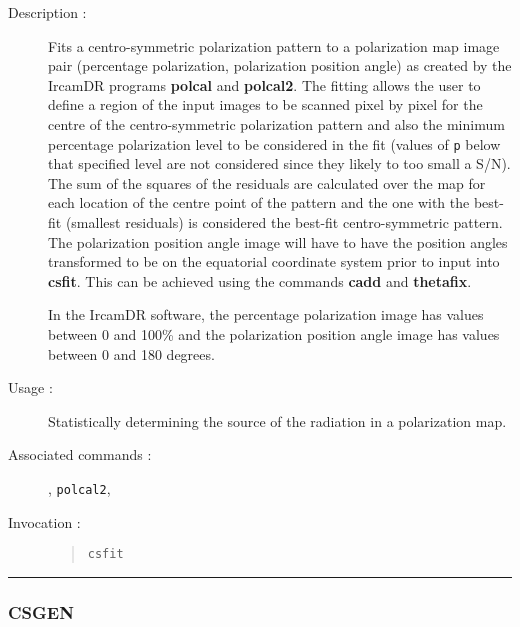 \begin{description}

\item[Description :] Fits a centro-symmetric polarization pattern to a
polarization map image pair (percentage polarization, polarization
position angle) as created by the {\sc IrcamDR} programs {\bf polcal}
and {\bf polcal2}.  The fitting allows the user to define a region of
the input images to be scanned pixel by pixel for the centre of the
centro-symmetric polarization pattern and also the minimum percentage
polarization level to be considered in the fit (values of {\tt p} below
that specified level are not considered since they likely to too small
a S/N).  The sum of the squares of the residuals are calculated over
the map for each location of the centre point of the pattern and the
one with the best-fit (smallest residuals) is considered the best-fit
centro-symmetric pattern.  The polarization position angle image will
have to have the position angles transformed to be on the equatorial
coordinate system prior to input into {\bf csfit}.  This can be
achieved using the commands {\bf cadd} and {\bf thetafix}.

In the {\sc IrcamDR} software, the percentage polarization image has
values between 0 and 100\% and the polarization position angle image
has values between 0 and 180 degrees.


\item[Usage :] Statistically determining the source of the radiation in a
polarization map.

\item[Associated commands :] {\tt {}},
{\tt polcal2}, {\tt {}}

\item[Invocation :]

\begin{quote}{\tt  csfit }\end{quote}

\end{description}

\hrule
\subsubsection*{\label{CSGEN}CSGEN}

